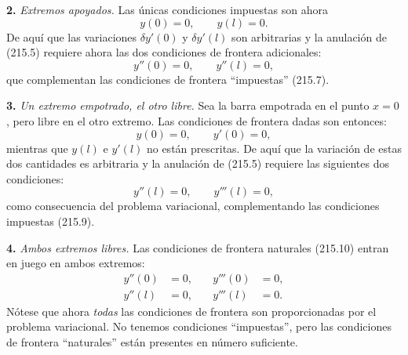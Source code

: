 \documentclass[12pt,a4paper]{book}
\begin{document}
\textbf{2.} \textit{Extremos apoyados.} Las únicas condiciones impuestas son ahora
\begin{equation}
y(0) = 0, \qquad y(l) = 0. \tag{215.7}
\end{equation}
De aquí que las variaciones $\delta y'(0)$ y $\delta y'(l)$ son arbitrarias y la anulación de (215.5) requiere ahora las dos condiciones de frontera adicionales:
\begin{equation}
y''(0) = 0, \qquad y''(l) = 0, \tag{215.8}
\end{equation}
que complementan las condiciones de frontera ``impuestas'' (215.7).

\textbf{3.} \textit{Un extremo empotrado, el otro libre.} Sea la barra empotrada en el punto $x = 0$, pero libre en el otro extremo. Las condiciones de frontera dadas son entonces:
\begin{equation}
y(0) = 0, \qquad y'(0) = 0, \tag{215.9}
\end{equation}
mientras que $y(l)$ e $y'(l)$ no están prescritas. De aquí que la variación de estas dos cantidades es arbitraria y la anulación de (215.5) requiere las siguientes dos condiciones:
\begin{equation}
y''(l) = 0, \qquad y'''(l) = 0, \tag{215.10}
\end{equation}
como consecuencia del problema variacional, complementando las condiciones impuestas (215.9).

\textbf{4.} \textit{Ambos extremos libres.} Las condiciones de frontera naturales (215.10) entran en juego en ambos extremos:
\begin{equation}
\begin{aligned}
y''(0) &= 0, &\quad y'''(0) &= 0, \\
y''(l) &= 0, &\quad y'''(l) &= 0.
\end{aligned} \tag{215.11}
\end{equation}
Nótese que ahora \textit{todas} las condiciones de frontera son proporcionadas por el problema variacional. No tenemos condiciones ``impuestas'', pero las condiciones de frontera ``naturales'' están presentes en número suficiente.
\end{document}
